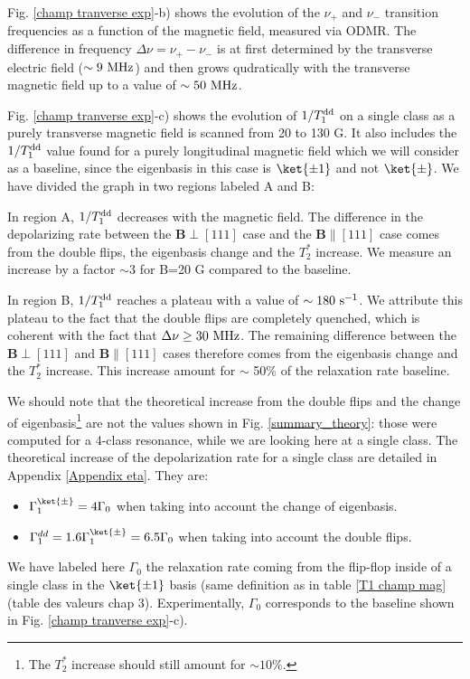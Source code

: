 \documentclass[a4paper, 11pt]{report}
\begin{document}
Fig. \ref{champ tranverse exp}-b) shows the evolution of the $\nu_+$ and $\nu_-$ transition frequencies as a function of the magnetic field, measured via ODMR. The difference in frequency $\Delta \nu = \nu_+ - \nu_-$ is at first determined by the transverse electric field ($\sim 9\ \rm MHz$) and then grows qudratically with the transverse magnetic field up to a value of $\sim 50\ \rm MHz$.

Fig. \ref{champ tranverse exp}-c) shows the evolution of $1/T_1^{\rm dd}$ on a single class as a purely transverse magnetic field is scanned from 20 to 130 G. It also includes the $1/T_1^{\rm dd}$ value found for a purely longitudinal magnetic field which we will consider as a baseline, since the eigenbasis in this case is $\ket{\pm 1}$ and not $\ket{\pm}$. We have divided the graph in two regions labeled A and B:

In region A, $1/T_1^{\rm dd}$ decreases with the magnetic field. The difference in the depolarizing rate between the $\mathbf{B} \perp [111]$ case and the $\mathbf{B} \parallel [111]$ case comes from the double flips, the eigenbasis change and the $T_2^*$ increase. We measure an increase by a factor $\sim 3$ for B=20 G compared to the baseline.

In region B, $1/T_1^{\rm dd}$ reaches a plateau with a value of $\sim 180\ \rm s^{-1}$. We attribute this plateau to the fact that the double flips are completely quenched, which is coherent with the fact that $\Delta \nu \geq 30\ \rm MHz$. The remaining difference between the $\mathbf{B} \perp [111]$ and $\mathbf{B} \parallel [111]$ cases therefore comes from the eigenbasis change and the $T_2^*$ increase. This increase amount for $\sim$ 50\% of the relaxation rate baseline.

We should note that the theoretical increase from the double flips and the change of eigenbasis\footnote{The $T_2^*$ increase should still amount for $\sim 10\%$.} are not the values shown in Fig. \ref{summary_theory}: those were computed for a 4-class resonance, while we are looking here at a single class. The theoretical increase of the depolarization rate for a single class are detailed in Appendix \ref{Appendix eta}. They are:
\begin{itemize}
\item $\Gamma_1^{\ket{\pm}}=4 \Gamma_0$ when taking into account the change of eigenbasis.
\item $\Gamma_1^{dd}=1.6\Gamma_1^{\ket{\pm}}=6.5\Gamma_0$ when taking into account the double flips.
\end{itemize}
We have labeled here $\Gamma_0$ the relaxation rate coming from the flip-flop inside of a single class in the $\ket{\pm 1}$ basis (same definition as in table \ref{T1 champ mag} (table des valeurs chap 3). Experimentally, $\Gamma_0$ corresponds to the baseline shown in Fig. \ref{champ tranverse exp}-c).
\end{document}
